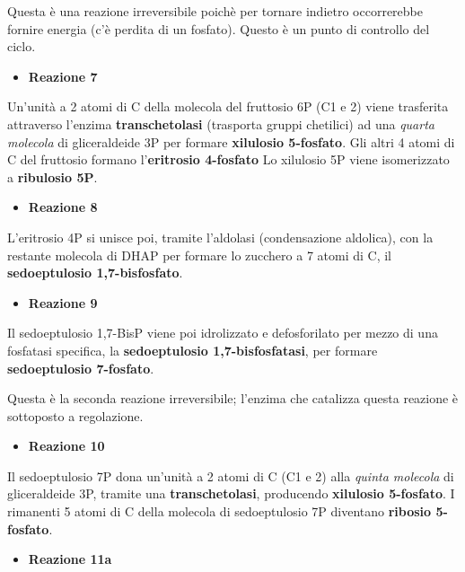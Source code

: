 \documentclass[]{article}
\begin{document}
Questa è una reazione irreversibile poichè per tornare indietro
occorrerebbe fornire energia (c'è perdita di un fosfato). Questo è un
punto di controllo del ciclo.

\begin{itemize}
\itemsep1pt\parskip0pt
\item
  \textbf{Reazione 7}
\end{itemize}

Un'unità a 2 atomi di C della molecola del fruttosio 6P (C1 e 2) viene
trasferita attraverso l'enzima \textbf{transchetolasi} (trasporta gruppi
chetilici) ad una \emph{quarta molecola} di gliceraldeide 3P per formare
\textbf{xilulosio 5-fosfato}. Gli altri 4 atomi di C del fruttosio
formano l'\textbf{eritrosio 4-fosfato} Lo xilulosio 5P viene
isomerizzato a \textbf{ribulosio 5P}.

\begin{itemize}
\itemsep1pt\parskip0pt
\item
  \textbf{Reazione 8}
\end{itemize}

L'eritrosio 4P si unisce poi, tramite l'aldolasi (condensazione
aldolica), con la restante molecola di DHAP per formare lo zucchero a 7
atomi di C, il \textbf{sedoeptulosio 1,7-bisfosfato}.

\begin{itemize}
\itemsep1pt\parskip0pt
\item
  \textbf{Reazione 9}
\end{itemize}

Il sedoeptulosio 1,7-BisP viene poi idrolizzato e defosforilato per
mezzo di una fosfatasi specifica, la \textbf{sedoeptulosio
1,7-bisfosfatasi}, per formare \textbf{sedoeptulosio 7-fosfato}.

Questa è la seconda reazione irreversibile; l'enzima che catalizza
questa reazione è sottoposto a regolazione.

\begin{itemize}
\itemsep1pt\parskip0pt
\item
  \textbf{Reazione 10}
\end{itemize}

Il sedoeptulosio 7P dona un'unità a 2 atomi di C (C1 e 2) alla
\emph{quinta molecola} di gliceraldeide 3P, tramite una
\textbf{transchetolasi}, producendo \textbf{xilulosio 5-fosfato}. I
rimanenti 5 atomi di C della molecola di sedoeptulosio 7P diventano
\textbf{ribosio 5-fosfato}.

\begin{itemize}
\itemsep1pt\parskip0pt
\item
  \textbf{Reazione 11a}
\end{itemize}
\end{document}
